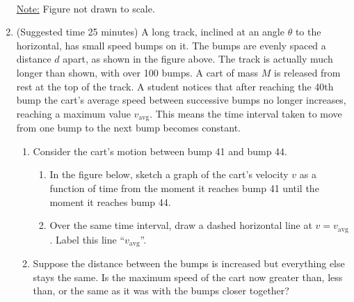 \documentclass{../../../oss-apphys}
\begin{document}
\begin{enumerate}[leftmargin=15pt]
  \begin{center}
    \\
    \underline{Note:} Figure not drawn to scale.
  \end{center}
\item (Suggested time 25 minutes) A long track, inclined at an angle $\theta$
  to the horizontal, has small speed bumps on it. The bumps are evenly spaced a
  distance $d$ apart, as shown in the figure above. The track is actually much
  longer than shown, with over 100 bumps. A cart of mass $M$ is released from
  rest at the top of the track. A student notices that after reaching the
  40th bump the cart's average speed between successive bumps no longer
  increases, reaching a maximum value $v_\mathrm{avg}$. This means the time
  interval taken to move from one bump to the next bump becomes constant.
  \begin{enumerate}[noitemsep,topsep=0pt]
  \item Consider the cart's motion between bump 41 and bump 44.
    \begin{enumerate}[noitemsep,topsep=0pt]
    \item In the figure below, sketch a graph of the cart's velocity $v$ as a
      function of time from the moment it reaches bump 41 until the moment it
      reaches bump 44.
    \item Over the same time interval, draw a dashed horizontal line at
      $v=v_\mathrm{avg}$. Label this line ``$v_\mathrm{avg}$''.
    \end{enumerate}
    \begin{center}
    \end{center}
  \item Suppose the distance between the bumps is increased but everything else
    stays the same. Is the maximum speed of the cart now greater than, less
    than, or the same as it was with the bumps closer together?


\end{enumerate}
\end{enumerate}
\end{document}
